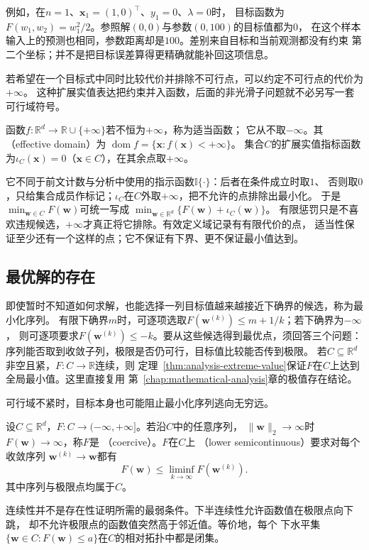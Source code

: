 例如，在$n=1$、$\bm{x}_1=(1,0)^\top$、$y_1=0$、$\lambda=0$时，
目标函数为$F(w_1,w_2)=w_1^2/2$。参照解$(0,0)$与参数$(0,100)$的目标值都为$0$，
在这个样本输入上的预测也相同，参数距离却是$100$。差别来自目标和当前观测都没有约束
第二个坐标；并不是把目标误差算得更精确就能补回这项信息。

若希望在一个目标式中同时比较代价并排除不可行点，可以约定不可行点的代价为$+\infty$。
这种扩展实值表达把约束并入函数，后面的非光滑子问题就不必另写一套可行域符号。
\begin{definition}
\label{def:opt-proper-domain-indicator}
函数$f:\mathbb R^d\to\mathbb R\cup\{+\infty\}$若不恒为$+\infty$，称为适当函数；
它从不取$-\infty$。其（effective domain）为
$\operatorname{dom}f=\{\bm x:f(\bm x)<+\infty\}$。
集合$C$的扩展实值指标函数为$\iota_C(\bm x)=0$（$\bm x\in C$），在其余点取$+\infty$。
\end{definition}
它不同于前文计数与分析中使用的指示函数$\mathbb I\{\cdot\}$：后者在条件成立时取$1$、
否则取$0$，只给集合成员作标记；$\iota_C$在$C$外取$+\infty$，把不允许的点排除出最小化。
于是$\min_{\bm w\in C}F(\bm w)$可统一写成
$\min_{\bm w\in\mathbb R^d}\{F(\bm w)+\iota_C(\bm w)\}$。
有限惩罚只是不喜欢违规候选，$+\infty$才真正将它排除。有效定义域记录有有限代价的点，
适当性保证至少还有一个这样的点；它不保证有下界、更不保证最小值达到。

\subsection{最优解的存在}
\label{sec:opt-existence}

即使暂时不知道如何求解，也能选择一列目标值越来越接近下确界的候选，称为最小化序列。
有限下确界$m$时，可逐项选取$F(\bm w^{(k)})\leq m+1/k$；若下确界为$-\infty$，
则可逐项要求$F(\bm w^{(k)})\leq-k$。要从这些候选得到最优点，须回答三个问题：
序列能否取到收敛子列，极限是否仍可行，目标值比较能否传到极限。
若$C\subseteq\mathbb{R}^d$非空且紧，$F:C\to\mathbb{R}$连续，则
定理~\ref{thm:analysis-extreme-value}保证$F$在$C$上达到全局最小值。这里直接复用
第~\ref{chap:mathematical-analysis}章的极值存在结论。

可行域不紧时，目标本身也可能阻止最小化序列逃向无穷远。
\begin{definition}[强制性与下半连续性]
\label{def:opt-coercive-lower-semicontinuous}
设$C\subseteq\mathbb R^d$，$F:C\to(-\infty,+\infty]$。若沿$C$中的任意序列，
$\lVert\bm{w}\rVert_2\to\infty$时$F(\bm{w})\to\infty$，称$F$是
（coercive）。$F$在$C$上
（lower semicontinuous）要求对每个收敛序列
$\bm{w}^{(k)}\to\bm{w}$都有
\[
  F(\bm{w})\leq\liminf_{k\to\infty}F(\bm{w}^{(k)}).
\]
其中序列与极限点均属于$C$。
\end{definition}
连续性并不是存在性证明所需的最弱条件。下半连续性允许函数值在极限点向下跳，
却不允许极限点的函数值突然高于邻近值。等价地，每个
下水平集$\{\bm{w}\in C:F(\bm{w})\leq a\}$在$C$的相对拓扑中都是闭集。

